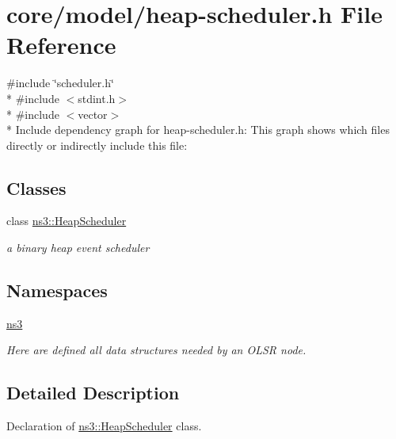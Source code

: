 \hypertarget{heap-scheduler_8h}{}\section{core/model/heap-\/scheduler.h File Reference}
\label{heap-scheduler_8h}
{\ttfamily \#include \char`\"{}scheduler.\+h\char`\"{}}\\*
{\ttfamily \#include $<$stdint.\+h$>$}\\*
{\ttfamily \#include $<$vector$>$}\\*
Include dependency graph for heap-\/scheduler.h\+:
This graph shows which files directly or indirectly include this file\+:
\subsection*{Classes}
\begin{DoxyCompactItemize}
\item 
class \hyperlink{classns3_1_1HeapScheduler}{ns3\+::\+Heap\+Scheduler}
\begin{DoxyCompactList}\small\item\em a binary heap event scheduler \end{DoxyCompactList}\end{DoxyCompactItemize}
\subsection*{Namespaces}
\begin{DoxyCompactItemize}
\item 
 \hyperlink{namespacens3}{ns3}
\begin{DoxyCompactList}\small\item\em Here are defined all data structures needed by an O\+L\+SR node. \end{DoxyCompactList}\end{DoxyCompactItemize}


\subsection{Detailed Description}
Declaration of \hyperlink{classns3_1_1HeapScheduler}{ns3\+::\+Heap\+Scheduler} class. 
